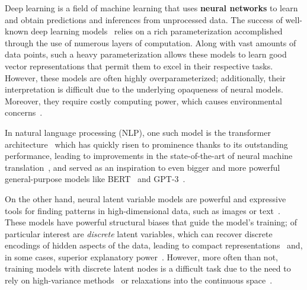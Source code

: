 \label{cap:int}

\cleardoublepage
\doublespacing

\noindent Deep learning is a field of machine learning that uses
\textbf{neural networks} to learn and obtain predictions
and inferences from unprocessed data. The success of well-known deep
learning models~\citep[\textit{inter
        alia}]{convnet,devlin2018bert,brown2020language} relies on a rich
parameterization accomplished through the use of numerous layers of
computation. Along with vast amounts of data points,
such a heavy parameterization allows these models to learn good
vector representations that permit them to excel in their respective
tasks. However, these models are often highly overparameterized;
additionally, their interpretation is difficult due to the underlying
opaqueness of neural models. Moreover, they require costly computing
power, which causes environmental concerns~\citep{Strubell2019}.

In
natural language processing (NLP), one such model is the transformer
architecture~\citep{vaswani2017attention} which has quickly risen to
prominence thanks to its outstanding performance, leading to
improvements in the state-of-the-art of neural machine
translation~\citep[NMT;][]{marian,ott2018scaling}, and served as an
inspiration to even bigger and more powerful general-purpose models
like BERT~\citep{devlin2018bert} and
\mbox{GPT-3}~\citep{brown2020language}.

On the other hand, neural latent variable models are powerful and
expressive tools for finding patterns in high-dimensional data, such
as images or text~\citep{Kim2018,Kingma+2014:VAE,RezendeEtAl14VAE}.
These models have powerful structural biases that guide the model's
training; of particular interest are \emph{discrete} latent
variables, which can recover discrete encodings of hidden aspects of
the data, leading to compact
representations~\citep{KingmaEtAl2014SSVAE} and, in some cases,
superior explanatory power~\citep{titov2008joint, Bastings2019}.
However, more often than not, training models with discrete latent
nodes is a difficult task due to the need to rely on high-variance
methods~\citep[\eg, \textsc{REINFORCE};][]{Williams1992} or relaxations
into the continuous space~\citep[\eg,
    Gumbel-Softmax;][]{GumbelSoftmax,Concrete}.

